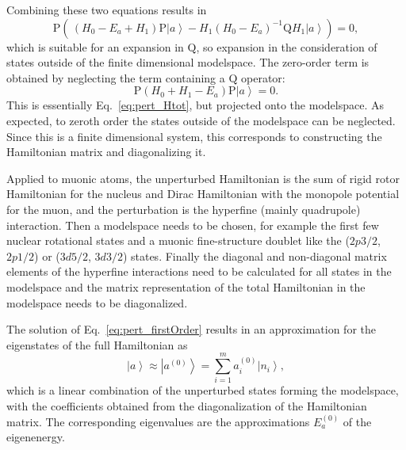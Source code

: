 Combining these two equations results in
\begin{equation}
\text{P}\left( \,
(H_0-E_a+H_1)\text{P}\left|a\right>
- H_1(H_0-E_a)^{-1}\text{Q}H_1\left|a\right>
\right) = 0,
\label{eq:pert_projectionEq}
\end{equation}
which is suitable for an expansion in $\text{Q}$, so expansion in the consideration of states outside of the finite dimensional modelspace. The zero-order term is obtained by neglecting the term containing a $\text{Q}$ operator:
\begin{equation}
\label{eq:pert_firstOrder}
\text{P}\left(H_0+H_1-E_a\right) \text{P}\left|a\right> = 0.
\end{equation}
This is essentially Eq.~\eqref{eq:pert_Htot}, but projected onto the modelspace. As expected, to zeroth order the states outside of the modelspace can be neglected. Since this is a finite dimensional system, this corresponds to constructing the Hamiltonian matrix and diagonalizing it. 

Applied to muonic atoms, the unperturbed Hamiltonian is the sum of rigid rotor Hamiltonian for the nucleus and Dirac Hamiltonian with the monopole potential for the muon, and the perturbation is the hyperfine (mainly quadrupole) interaction. Then a modelspace needs to be chosen, for example the first few nuclear rotational states and a muonic fine-structure doublet like the ($2p3/2$, $2p1/2$) or ($3d5/2$, $3d3/2$) states. Finally the diagonal and non-diagonal matrix elements of the hyperfine interactions need to be calculated for all states in the modelspace and the matrix representation of the total Hamiltonian in the modelspace needs to be diagonalized.

The solution of Eq.~\eqref{eq:pert_firstOrder} results in an approximation for the eigenstates of the full Hamiltonian as
\begin{equation}
\label{eq:pert_firstOrderState}
\left|a\right>\approx \left|a^{(0)}\right> = \sum_{i=1}^m a_i^{(0)}\left|n_i\right>,
\end{equation}
which is a linear combination of the unperturbed states forming the modelspace, with the coefficients obtained from the diagonalization of the Hamiltonian matrix. The corresponding eigenvalues are the approximations $E_a^{(0)}$ of the eigenenergy.

